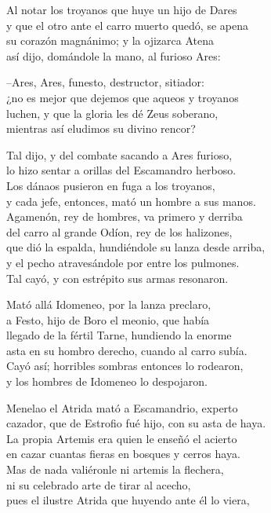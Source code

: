 \documentclass[11pt,twoside]{article}
\begin{document}
Al notar los troyanos que huye un hijo de Dares\\
y que el otro ante el carro muerto quedó, se apena\\
su corazón magnánimo; y la ojizarca Atena\\
así dijo, domándole la mano, al furioso Ares:\par
--Ares, Ares, funesto, destructor, sitiador:\\
¿no es mejor que dejemos que aqueos y troyanos\\
luchen, y que la gloria les dé Zeus soberano,\\
mientras así eludimos su divino rencor?\par
Tal dijo, y del combate sacando a Ares furioso,\\
lo hizo sentar a orillas del Escamandro herboso.\\
Los dánaos pusieron en fuga a los troyanos,\\
y cada jefe, entonces, mató un hombre a sus manos.\\
Agamenón, rey de hombres, va primero y derriba\\
del carro al grande Odíon, rey de los halizones,\\
que dió la espalda, hundiéndole su lanza desde arriba,\\
y el pecho atravesándole por entre los pulmones.\\
Tal cayó, y con estrépito sus armas resonaron.\par
Mató allá Idomeneo, por la lanza preclaro,\\
a Festo, hijo de Boro el meonio, que había\\
llegado de la fértil Tarne, hundiendo la enorme\\
asta en su hombro derecho, cuando al carro subía.\\
Cayó así; horribles sombras entonces lo rodearon,\\
y los hombres de Idomeneo lo despojaron.\par
Menelao el Atrida mató a Escamandrio, experto\\
cazador, que de Estrofio fué hijo, con su asta de haya.\\
La propia Artemis era quien le enseñó el acierto\\
en cazar cuantas fieras en bosques y cerros haya.\\
Mas de nada valiéronle ni artemis la flechera,\\
ni su celebrado arte de tirar al acecho,\\
pues el ilustre Atrida que huyendo ante él lo viera,\\
\end{document}
